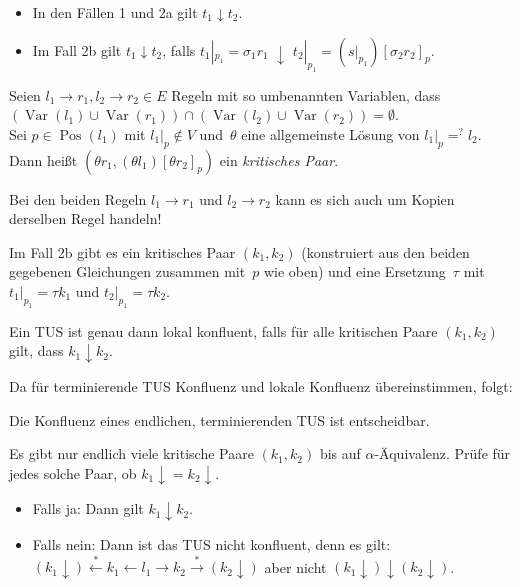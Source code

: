 \documentclass{cheat-sheet}
\newcommand{\from}{\leftarrow}
\newcommand{\reducesTo}{\xrightarrow{*}}
\newcommand{\reducesFrom}{\xleftarrow{*}}
\newcommand{\joinable}{\downarrow}
\newcommand{\NF}[1]{{{#1}\!\downarrow}} %
\DeclareMathOperator{\Pos}{Pos} %
\DeclareMathOperator{\Var}{Var} %
\begin{document}
\begin{lem}
  \begin{itemize}
    \item In den Fällen 1 und 2a gilt $t_1 \joinable t_2$.
    \item Im Fall 2b gilt $t_1 \joinable t_2$, falls $t_1|_{p_1} \!\!=\! \sigma_1 r_1 \,\,\joinable\,\, t_2|_{p_1} \!=\! (s|_{p_1}) [\sigma_2 r_2]_p$.
  \end{itemize}
\end{lem}

\begin{defn}
  Seien $l_1 \to r_1, l_2 \to r_2 \in E$ Regeln mit so umbenannten Variablen, dass $(\Var(l_1) \cup \Var(r_1)) \cap (\Var(l_2) \cup \Var(r_2)) = \emptyset$. \\
  Sei $p \in \Pos(l_1)$ mit $l_1|_p \not\in V$ und~$\theta$ eine allgemeinste Lösung von $l_1|_p =^{?} l_2$.
  Dann heißt $(\theta r_1, (\theta l_1)[\theta r_2]_p)$ ein \emph{kritisches Paar}.
\end{defn}

\begin{acht}
  Bei den beiden Regeln $l_1 \to r_1$ und $l_2 \to r_2$ kann es sich auch um Kopien derselben Regel handeln!
\end{acht}

\begin{beob}
  Im Fall 2b gibt es ein kritisches Paar $(k_1, k_2)$ (konstruiert aus den beiden gegebenen Gleichungen zusammen mit~$p$ wie oben) und eine Ersetzung~$\tau$ mit $t_1|_{p_1} = \tau k_1$ und $t_2|_{p_1} = \tau k_2$.
\end{beob}

\begin{satz}
  Ein TUS ist genau dann lokal konfluent, falls für alle kritischen Paare $(k_1, k_2)$ gilt, dass $k_1 \joinable k_2$.
\end{satz}

Da für terminierende TUS Konfluenz und lokale Konfluenz übereinstimmen, folgt:

\begin{kor}
  Die Konfluenz eines endlichen, terminierenden TUS ist entscheidbar.
\end{kor}

\begin{beweisskizze}
  Es gibt nur endlich viele kritische Paare $(k_1, k_2)$ bis auf $\alpha$-Äquivalenz.
  Prüfe für jedes solche Paar, ob $\NF{k_1} = \NF{k_2}$.
  \begin{itemize}
    \item Falls ja: Dann gilt $k_1 \joinable k_2$.
    \item Falls nein: Dann ist das TUS nicht konfluent, denn es gilt: \\
    $(\NF{k_1}) \reducesFrom k_1 \from l_1 \to k_2 \reducesTo (\NF{k_2})$ aber nicht $(\NF{k_1}) \joinable (\NF{k_2})$.
  \end{itemize}
\end{beweisskizze}
\end{document}
